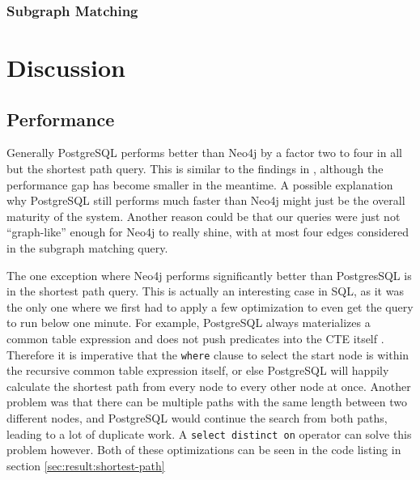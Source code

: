 \documentclass[11pt, a4paper,oneside,chapterprefix=false]{scrbook}
\begin{document}
\subsection{Subgraph Matching} \label{sec:result:subgraph-matching}





\chapter{Discussion} \label{chp:Discussion}

\section{Performance}

Generally PostgreSQL performs better than Neo4j by a factor two to four in all but the shortest path query.
This is similar to the findings in \cite{graphdbbenchmark}, although the performance gap has become smaller in the meantime.
A possible explanation why PostgreSQL still performs much faster than Neo4j might just be the overall maturity of the system.
Another reason could be that our queries were just not ``graph-like'' enough for Neo4j to really shine, with at most four edges considered in the subgraph matching query.

The one exception where Neo4j performs significantly better than PostgresSQL is in the shortest path query.
This is actually an interesting case in SQL, as it was the only one where we first had to apply a few optimization to even get the query to run below one minute. For example, PostgreSQL always materializes a common table expression and does not push predicates into the CTE itself \cite{postgresMaterialize}.
Therefore it is imperative that the \lstinline{where} clause to select the start node is within the recursive common table expression itself, or else PostgreSQL will happily calculate the shortest path from every node to every other node at once. Another problem was that there can be multiple paths with the same length between two different nodes, and PostgreSQL would continue the search from both paths, leading to a lot of duplicate work. A \lstinline{select distinct on} operator can solve this problem however.
Both of these optimizations can be seen in the code listing in section \ref{sec:result:shortest-path}
\end{document}
